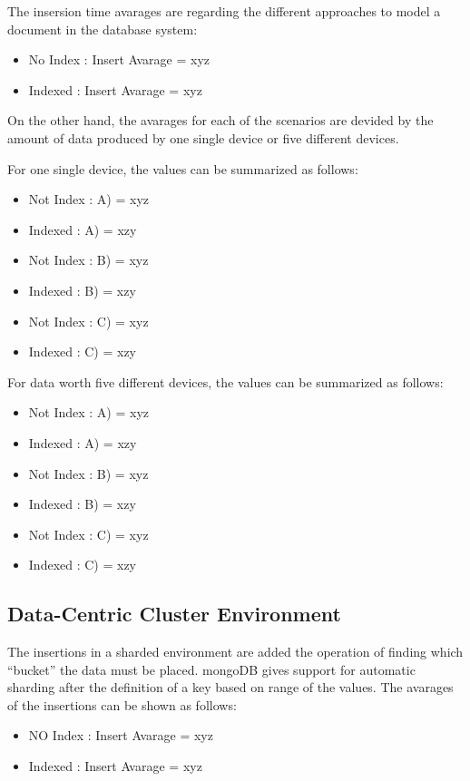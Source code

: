 The insersion time avarages are regarding the different approaches to model a
document in the database system:

\begin{itemize}
  \item No Index : Insert Avarage = xyz 
  \item Indexed : Insert Avarage = xyz
\end{itemize}

On the other hand, the avarages for each of the scenarios are devided by the
amount of data produced by one single device or five different devices.

For one single device, the values can be summarized as follows:
\begin{itemize}
  \item Not Index : A) = xyz
  \item Indexed : A) = xzy
  \item Not Index : B) = xyz
  \item Indexed : B) = xzy
  \item Not Index : C) = xyz
  \item Indexed : C) = xzy
\end{itemize}

For data worth five different devices, the values can be summarized as follows:
\begin{itemize}
  \item Not Index : A) = xyz
  \item Indexed : A) = xzy
  \item Not Index : B) = xyz
  \item Indexed : B) = xzy
  \item Not Index : C) = xyz
  \item Indexed : C) = xzy
\end{itemize}

\subsection{Data-Centric Cluster Environment}

The insertions in a sharded environment are added the operation of finding
which ``bucket'' the data must be placed. mongoDB gives support for automatic
sharding after the definition of a key based on range of the values. The
avarages of the insertions can be shown as follows:

\begin{itemize}
  \item NO Index : Insert Avarage = xyz
  \item Indexed : Insert Avarage = xyz
\end{itemize}

